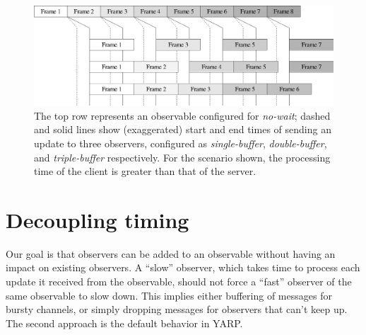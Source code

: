 \begin{figure}[t]
\includegraphics[width=\columnwidth]{fig-throughput-nowait}
\caption{
The top row represents an observable configured for \textit{no-wait};
dashed and solid lines show (exaggerated) start and end times of 
sending an update to three observers, configured as
 \textit{single-buffer},
 \textit{double-buffer},
and \textit{triple-buffer}
respectively.  For the scenario shown, the processing time of the
client is greater than that of the server.
}
\label{fig:throughput-nowait}
\end{figure}



\section{Decoupling timing}

Our goal is that observers can be added to an observable without
having an impact on existing observers.  
%
A ``slow'' observer, which takes time to process each update it
received from the observable, should not force a ``fast'' observer of
the same observable to slow down.  This implies either buffering
of messages for bursty channels, or simply dropping messages for
observers that can't keep up.  The second approach is the default
behavior in YARP.

